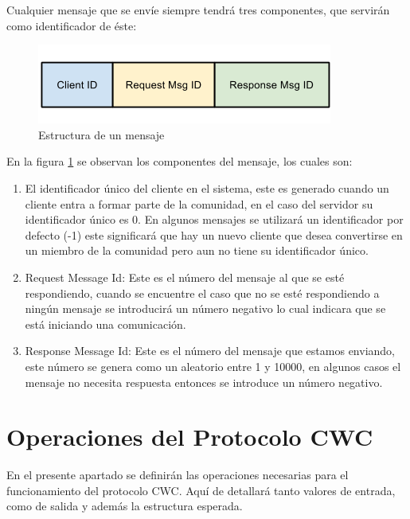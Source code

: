 Cualquier mensaje que se envíe siempre tendrá tres componentes, que servirán como identificador de éste:

\begin{figure}[h]
  \centering
    \includegraphics[scale=0.75]{gfx/EstructuraMensajeCWC}
  \caption{Estructura de un mensaje}
  \label{EstructuraMensajeCWC}
\end{figure}


En la figura \ref{EstructuraMensajeCWC} se observan los componentes del mensaje, los cuales son:

\begin{enumerate}
\item El identificador único del cliente en el sistema, este es generado cuando un cliente entra a formar parte de la comunidad, en el caso del servidor su identificador único es 0. En algunos mensajes se utilizará un identificador por defecto (-1) este significará que hay un nuevo cliente que desea convertirse en un miembro de la comunidad pero aun no tiene su identificador único.

\item Request Message Id: Este es el número del mensaje al que se esté respondiendo, cuando se encuentre el caso que no se esté respondiendo a ningún mensaje se introducirá un número negativo lo cual indicara que se está iniciando una comunicación.

\item Response Message Id: Este es el número del mensaje que estamos enviando, este número se genera como un aleatorio entre 1 y 10000, en algunos casos el mensaje no necesita respuesta entonces se introduce un número negativo.
\end{enumerate}


\section{Operaciones del Protocolo CWC}

En el presente apartado se definirán las operaciones necesarias para el funcionamiento del protocolo CWC. Aquí de detallará tanto valores de entrada, como de salida y además la estructura esperada. 

